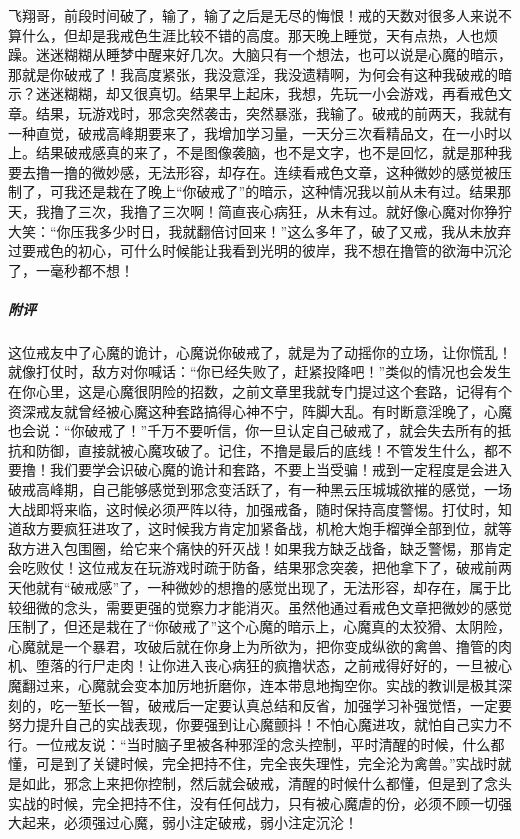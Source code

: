 \begin{case}
    飞翔哥，前段时间破了，输了，输了之后是无尽的悔恨！戒的天数对很多人来说不算什么，但却是我戒色生涯比较不错的高度。那天晚上睡觉，天有点热，人也烦躁。迷迷糊糊从睡梦中醒来好几次。大脑只有一个想法，也可以说是心魔的暗示，那就是你破戒了！我高度紧张，我没意淫，我没遗精啊，为何会有这种我破戒的暗示？迷迷糊糊，却又很真切。结果早上起床，我想，先玩一小会游戏，再看戒色文章。结果，玩游戏时，邪念突然袭击，突然暴涨，我输了。破戒的前两天，我就有一种直觉，破戒高峰期要来了，我增加学习量，一天分三次看精品文，在一小时以上。结果破戒感真的来了，不是图像袭脑，也不是文字，也不是回忆，就是那种我要去撸一撸的微妙感，无法形容，却存在。连续看戒色文章，这种微妙的感觉被压制了，可我还是栽在了晚上“你破戒了”的暗示，这种情况我以前从未有过。结果那天，我撸了三次，我撸了三次啊！简直丧心病狂，从未有过。就好像心魔对你狰狞大笑：“你压我多少时日，我就翻倍讨回来！”这么多年了，破了又戒，我从未放弃过要戒色的初心，可什么时候能让我看到光明的彼岸，我不想在撸管的欲海中沉沦了，一毫秒都不想！
    \subparagraph{附评} 这位戒友中了心魔的诡计，心魔说你破戒了，就是为了动摇你的立场，让你慌乱！就像打仗时，敌方对你喊话：“你已经失败了，赶紧投降吧！”类似的情况也会发生在你心里，这是心魔很阴险的招数，之前文章里我就专门提过这个套路，记得有个资深戒友就曾经被心魔这种套路搞得心神不宁，阵脚大乱。有时断意淫晚了，心魔也会说：“你破戒了！”千万不要听信，你一旦认定自己破戒了，就会失去所有的抵抗和防御，直接就被心魔攻破了。记住，不撸是最后的底线！不管发生什么，都不要撸！我们要学会识破心魔的诡计和套路，不要上当受骗！戒到一定程度是会进入破戒高峰期，自己能够感觉到邪念变活跃了，有一种黑云压城城欲摧的感觉，一场大战即将来临，这时候必须严阵以待，加强戒备，随时保持高度警惕。打仗时，知道敌方要疯狂进攻了，这时候我方肯定加紧备战，机枪大炮手榴弹全部到位，就等敌方进入包围圈，给它来个痛快的歼灭战！如果我方缺乏战备，缺乏警惕，那肯定会吃败仗！这位戒友在玩游戏时疏于防备，结果邪念突袭，把他拿下了，破戒前两天他就有“破戒感”了，一种微妙的想撸的感觉出现了，无法形容，却存在，属于比较细微的念头，需要更强的觉察力才能消灭。虽然他通过看戒色文章把微妙的感觉压制了，但还是栽在了“你破戒了”这个心魔的暗示上，心魔真的太狡猾、太阴险，心魔就是一个暴君，攻破后就在你身上为所欲为，把你变成纵欲的禽兽、撸管的肉机、堕落的行尸走肉！让你进入丧心病狂的疯撸状态，之前戒得好好的，一旦被心魔翻过来，心魔就会变本加厉地折磨你，连本带息地掏空你。实战的教训是极其深刻的，吃一堑长一智，破戒后一定要认真总结和反省，加强学习补强觉悟，一定要努力提升自己的实战表现，你要强到让心魔颤抖！不怕心魔进攻，就怕自己实力不行。一位戒友说：“当时脑子里被各种邪淫的念头控制，平时清醒的时候，什么都懂，可是到了关键时候，完全把持不住，完全丧失理性，完全沦为禽兽。”实战时就是如此，邪念上来把你控制，然后就会破戒，清醒的时候什么都懂，但是到了念头实战的时候，完全把持不住，没有任何战力，只有被心魔虐的份，必须不顾一切强大起来，必须强过心魔，弱小注定破戒，弱小注定沉沦！
\end{case}

